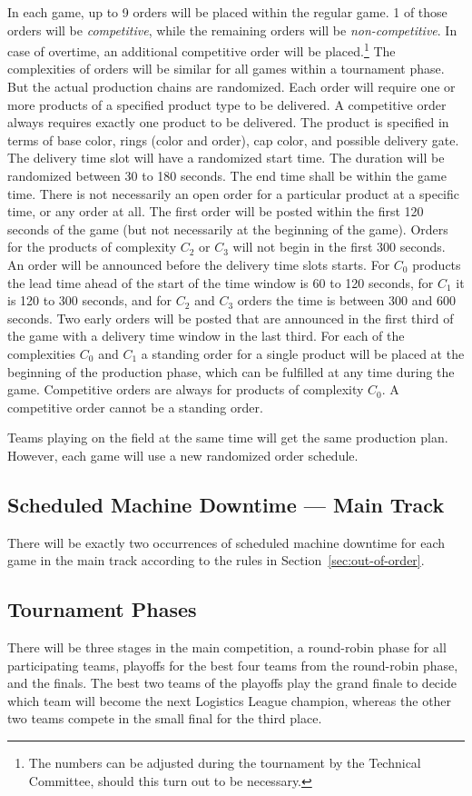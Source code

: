 \documentclass[12pt,twoside]{article}
\newcommand{\refsec}[1]{Section~\ref{#1}}
\begin{document}
In each game, up to 9 orders will be placed within the regular game.
1 of those orders will be \emph{competitive}, while the remaining
orders will be \emph{non-competitive}. In case of overtime, an
additional competitive order will be placed.\footnote{The numbers can
be adjusted during the tournament by the Technical Committee, should
this turn out to be necessary.}
The complexities of orders will be similar for all games within a
tournament phase. But the actual production chains are randomized.
Each order will require one or more products of a specified product
type to be delivered. A competitive order always requires exactly one
product to be delivered. The product is specified in terms of base
color, rings (color and order), cap color, and possible delivery gate.
The delivery time slot will have a randomized start time. The duration
will be randomized between 30 to 180 seconds. The end time shall be
within the game time. There is not necessarily an open order for a
particular product at a specific time, or any order at all. The first
order will be posted within the first 120 seconds of the game (but not
necessarily at the beginning of the game). Orders for the products of
complexity $C_2$ or $C_3$ will not begin in the first 300 seconds. An
order will be announced before the delivery time slots starts. For
$C_0$ products the lead time ahead of the start of the time window is
60 to 120 seconds, for $C_1$ it is 120 to 300 seconds, and for $C_2$
and $C_3$ orders the time is between 300 and 600 seconds. Two early
orders will be posted that are announced in the first third of the
game with a delivery time window in the last third. For each of the
complexities $C_0$ and $C_1$ a standing order for a single product
will be placed at the beginning of the production phase, which can be
fulfilled at any time during the game. Competitive orders are always for
products of complexity $C_0$. A competitive order cannot be a standing order.

Teams playing on the field at the same time will get the same
production plan. However, each game will use a new randomized order
schedule.

\subsection{Scheduled Machine Downtime --- Main Track}
There will be exactly two occurrences of scheduled machine downtime for each
game in the main track according to the rules in \refsec{sec:out-of-order}.

\subsection{Tournament Phases}
\label{sec:tournament-phases}
There will be three stages in the main competition, a round-robin
phase for all participating teams, playoffs for the best four teams
from the round-robin phase, and the finals. The best two teams of the
playoffs play the grand finale to decide which team will become the
next Logistics League champion, whereas the other two teams compete in
the small final for the third place.
\end{document}

